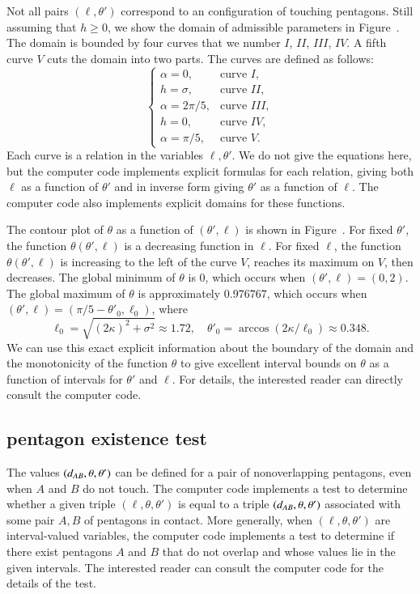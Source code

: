 Not all pairs $(\ell,\theta')$ correspond to an configuration of
touching pentagons.  Still assuming that $h\ge0$, we show the domain
of admissible parameters in Figure~.  The
domain is bounded by four curves that we number $I$, $II$, $III$,
$IV$.  A fifth curve $V$ cuts the domain into two parts.  The curves
are defined as follows:
\[
\begin{cases}
\alpha = 0, &\text{curve } I,\\
h = \sigma, &\text{curve } II,\\
\alpha = 2\pi/5, &\text{curve } III,\\
h = 0, & \text{curve } IV,\\
\alpha = \pi/5, & \text{curve } V.
\end{cases}
\]
Each curve is a relation in the variables $\ell,\theta'$.  We do not
give the equations here, but the computer code implements explicit
formulas for each relation, giving both $\ell$ as a function of
$\theta'$ and in inverse form giving $\theta'$ as a function of
$\ell$.  The computer code also implements explicit domains for these
functions.


The contour plot of $\theta$ as a function of $(\theta',\ell)$ is
shown in Figure~.  For fixed $\theta'$, the
function $\theta(\theta',\ell)$ is a decreasing function in $\ell$.
For fixed $\ell$, the function $\theta(\theta',\ell)$ is increasing to
the left of the curve $V$, reaches its maximum on $V$, then decreases.
The global minimum of $\theta$ is $0$, which occurs when
$(\theta',\ell)=(0,2)$.  The global maximum of $\theta$ is
approximately $0.976767$, which occurs when $(\theta',\ell) = (\pi/5 -
\theta'_0,\ell_0)$, where
\[
\ell_0 = \sqrt{(2\kappa)^2 + \sigma^2}\approx 1.72,\quad
\theta'_0 = \arccos (2\kappa/\ell_0) \approx 0.348.
\]
We can use this exact explicit information about the boundary of the
domain and the monotonicity of the function $\theta$ to give excellent
interval bounds on $\theta$ as a function of intervals for $\theta'$
and $\ell$.  For details, the interested reader can directly consult
the computer code.


\subsection{pentagon existence test}

The values $(d_{AB},\theta,\theta')$ can be defined for a pair of
nonoverlapping pentagons, even when $A$ and $B$ do not touch.  The
computer code implements a test to determine whether a given triple
$(\ell,\theta,\theta')$ is equal to a triple
$(d_{AB},\theta,\theta')$ associated with some pair $A,B$ of
pentagons in contact.  More generally, when $(\ell,\theta,\theta')$
are interval-valued variables, the computer code implements a test to
determine if there exist pentagons $A$ and $B$ that do not overlap and
whose values lie in the given intervals.  The interested reader can
consult the computer code for the details of the test.


